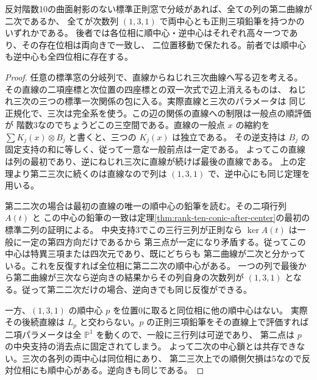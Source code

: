 \begin{corollary}\label{cor:rank-ten-uniform-corridor-types}
反対階数10の曲面射影のない標準正則窓で分岐があれば、全ての列の第二曲線が二次であるか、
全てが次数列 $(1,3,1)$ で両中心とも正則三項鉛筆を持つかのいずれかである。
後者では各位相に順中心・逆中心はそれぞれ高々一つであり、その存在位相は両向きで一致し、
二位置移動で保たれる。前者では順中心も逆中心も全四位相に存在する。
\end{corollary}
\begin{proof}
任意の標準窓の分岐列で、直線からねじれ三次曲線へ写る辺を考える。
その直線の二項座標と次位置の四座標との双一次式で辺上消えるものは、
ねじれ三次の三つの標準一次関係の包に入る。実際直線と三次のパラメータは
同じ正規化で、三次は完全系を使う。この辺の関係の直線への制限は一般点の順評価が
階数3なのでちょうどこの三空間である。直線の一般点 $x$ の縮約を
$\sum K_j(x)\otimes B_j$ と書くと、三つの $K_j(x)$ は独立である。
その逆支持は $B_j$ の固定支持の和に等しく、従って一意な一般前点は一定である。
よってこの直線は列の最初であり、逆にねじれ三次に直線が続けば最後の直線である。
上の定理より第二三次に続くのは直線なので列は $(1,3,1)$ で、逆中心にも同じ定理を用いる。

第二二次の場合は最初の直線の唯一の順中心の鉛筆を読む。その二項行列 $A(t)$ と
この中心の鉛筆の一致は定理\ref{thm:rank-ten-conic-after-center}の最初の標準二列の証明による。
中央支持3でこの三行三列が正則なら $\ker A(t)$ は一般に一定の第四方向だけであるから
第三点が一定になり矛盾する。従ってこの中心は特異三項または四次元であり、既にどちらも
第二曲線が二次と分かっている。これを反復すれば全位相に第二二次の順中心がある。
一つの列で最後から第二曲線が三次なら逆向きの結果からその列自身の次数列が $(1,3,1)$ となる。従って第二二次だけの場合、逆向きでも同じ反復ができる。

一方、$(1,3,1)$ の順中心 $p$ を位置0に取ると同位相に他の順中心はない。
実際その後続直線は $L_p$ と交わらない。$p$ の正則三項鉛筆をその直線上で評価すれば
二項パラメータは全 $\mathbb P^1$ を動くので、一般に三行列は可逆であり、
第二点は $p$ の中央支持の消去点に固定されてしまう。
よって二次の中心鎖とは共存できない。三次の各列の両中心は同位相にあり、
第二三次上での順側欠損は5なので反対位相にも順中心がある。逆向きも同じである。
\end{proof}
